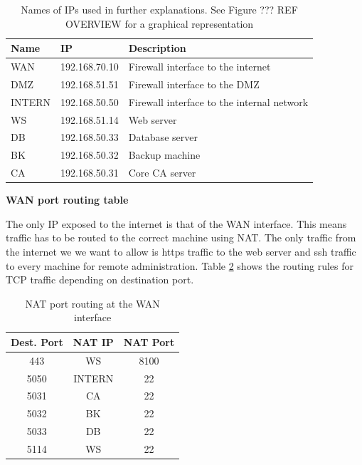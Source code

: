 \documentclass[english]{article}
\begin{document}
\begin{table}[h]
\centering
\begin{tabular}{|l|l|l|}
\hline
\textbf{Name} & \textbf{IP} & \textbf{Description} \\ \hline
WAN & 192.168.70.10 & Firewall interface to the internet \\ \hline
DMZ & 192.168.51.51 & Firewall interface to the DMZ \\ \hline
INTERN & 192.168.50.50 & Firewall interface to the internal network \\ \hline
WS & 192.168.51.14 & Web server \\ \hline
DB & 192.168.50.33 & Database server \\ \hline
BK & 192.168.50.32 & Backup machine \\ \hline
CA & 192.168.50.31 & Core CA server \\ \hline

\end{tabular}
\caption{Names of IPs used in further explanations. See Figure ??? REF OVERVIEW for a graphical representation}
\label{fw_ip_names}
\end{table}


\textbf{WAN port routing table}

The only IP exposed to the internet is that of the WAN interface. This means traffic has to be routed to the correct machine using NAT. The only traffic from the internet we we want to allow is https traffic to the web server and ssh traffic to every machine for remote administration. Table \ref{fw_inet_nat} shows the routing rules for TCP traffic depending on destination port.

\begin{table}[h]
\centering
\begin{tabular}{|c||c|c|}
\hline
\textbf{Dest. Port} & \textbf{NAT IP} & \textbf{NAT Port} \\ \hline
443 & WS & 8100 \\ \hline
5050 & INTERN & 22 \\ \hline
5031 & CA & 22 \\ \hline
5032 & BK & 22 \\ \hline
5033 & DB & 22 \\ \hline
5114 & WS & 22 \\ \hline

\end{tabular}
\caption{NAT port routing at the WAN interface}
\label{fw_inet_nat}
\end{table}
\end{document}
